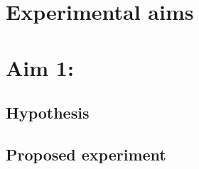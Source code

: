 \documentclass[12pt]{article}
\newcommand{\naive}{na\"{i}ve }
\begin{document}
%
%		
%			
%		
%	
			
	\section{Experimental aims}
	
	\section{Aim 1:}
		
		\subsection{Hypothesis}
		
		\subsection{Proposed experiment}
		
\end{document}
